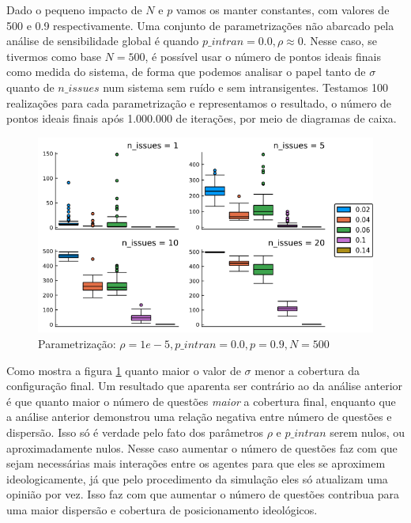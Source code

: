     Dado o pequeno impacto de \(N\) e \(p\) vamos os manter constantes, com
    valores de 500 e 0.9 respectivamente. Uma conjunto de parametrizações não
    abarcado pela análise de sensibilidade global é quando \(p\_intran = 0.0, \rho \approx
    0 \). Nesse caso, se tivermos como base \(N = 500\), é possível usar o
    número de pontos ideais finais como medida do sistema, de forma que podemos
    analisar o papel tanto de \(\sigma\) quanto de \(n\_issues\) num sistema sem
    ruído e sem intransigentes. Testamos 100 realizações para cada
    parametrização e representamos o resultado, o número de pontos ideais finais
    após 1.000.000 de iterações, por meio de diagramas de caixa.
    
  \begin{figure}[H]
    \centering
    \includegraphics[scale=0.7]{ims/boxes4.png}
    \caption{Parametrização: \(\rho =1e-5, p\_intran = 0.0, p = 0.9, N =500\)}
    \label{fig:box4}
  \end{figure}
  
  Como mostra a figura \ref{fig:box4} quanto maior o valor de \(\sigma\) menor a
  cobertura da configuração final. Um resultado que aparenta ser contrário ao da
  análise anterior é que quanto maior o número de questões \textit{maior} a
  cobertura final, enquanto que a análise anterior demonstrou uma relação
  negativa entre número de questões e dispersão. Isso só é verdade pelo fato dos
  parâmetros \(\rho\) e \(p\_intran\) serem nulos, ou aproximadamente nulos. Nesse
  caso aumentar o número de questões faz com que sejam necessárias mais
  interações entre os agentes para que eles se aproximem ideologicamente, já que
  pelo procedimento da simulação eles só atualizam uma opinião por vez. Isso faz
  com que aumentar o número de questões contribua para uma maior dispersão e
  cobertura de posicionamento ideológicos.
  

